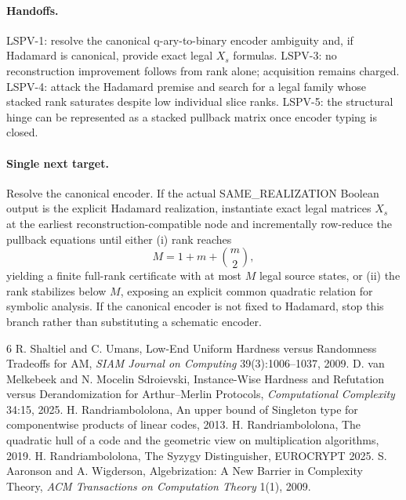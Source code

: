 \documentclass[11pt]{article}
\begin{document}
\paragraph{Handoffs.}
LSPV-1: resolve the canonical q-ary-to-binary encoder ambiguity and, if Hadamard is canonical, provide exact legal \(X_s\) formulas. LSPV-3: no reconstruction improvement follows from rank alone; acquisition remains charged. LSPV-4: attack the Hadamard premise and search for a legal family whose stacked rank saturates despite low individual slice ranks. LSPV-5: the structural hinge can be represented as a stacked pullback matrix once encoder typing is closed.

\paragraph{Single next target.}
Resolve the canonical encoder. If the actual SAME\_REALIZATION Boolean output is the explicit Hadamard realization, instantiate exact legal matrices \(X_s\) at the earliest reconstruction-compatible node and incrementally row-reduce the pullback equations until either (i) rank reaches
\[
M=1+m+\binom m2,
\]
yielding a finite full-rank certificate with at most \(M\) legal source states, or (ii) the rank stabilizes below \(M\), exposing an explicit common quadratic relation for symbolic analysis. If the canonical encoder is not fixed to Hadamard, stop this branch rather than substituting a schematic encoder.

\begin{thebibliography}{6}
 R. Shaltiel and C. Umans, Low-End Uniform Hardness versus Randomness Tradeoffs for AM, \emph{SIAM Journal on Computing} 39(3):1006--1037, 2009.
 D. van Melkebeek and N. Mocelin Sdroievski, Instance-Wise Hardness and Refutation versus Derandomization for Arthur--Merlin Protocols, \emph{Computational Complexity} 34:15, 2025.
 H. Randriambololona, An upper bound of Singleton type for componentwise products of linear codes, 2013.
 H. Randriambololona, The quadratic hull of a code and the geometric view on multiplication algorithms, 2019.
 H. Randriambololona, The Syzygy Distinguisher, EUROCRYPT 2025.
 S. Aaronson and A. Wigderson, Algebrization: A New Barrier in Complexity Theory, \emph{ACM Transactions on Computation Theory} 1(1), 2009.
\end{thebibliography}
\end{document}
